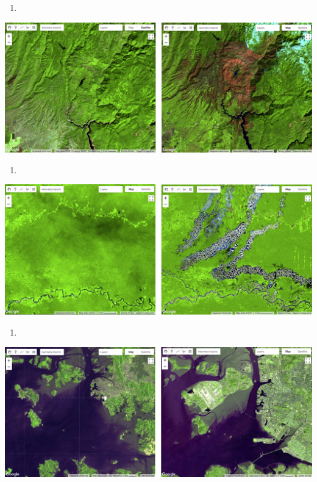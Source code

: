 \documentclass[
  letterpaper,
  DIV=11,
  numbers=noendperiod]{scrreprt}
\providecommand{\tightlist}{%
  \setlength{\itemsep}{0pt}\setlength{\parskip}{0pt}}\usepackage{longtable,booktabs,array}
\begin{document}
\begin{enumerate}
\def\labelenumi{\alph{enumi})}
\setcounter{enumi}{1}
\tightlist
\item
\end{enumerate}

\includegraphics{./F4/image21.png}

\begin{enumerate}
\def\labelenumi{\alph{enumi})}
\setcounter{enumi}{2}
\tightlist
\item
\end{enumerate}

\includegraphics{./F4/image75.png}

\begin{enumerate}
\def\labelenumi{\alph{enumi})}
\setcounter{enumi}{3}
\tightlist
\item
\end{enumerate}

\includegraphics{./F4/image87.png}
\end{document}
